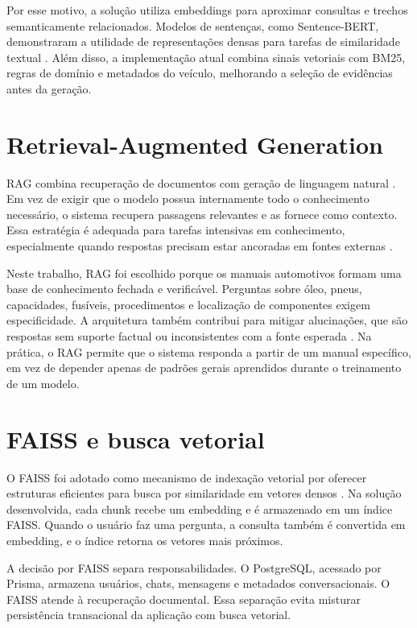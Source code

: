 Por esse motivo, a solução utiliza embeddings para aproximar consultas e trechos semanticamente relacionados. Modelos de sentenças, como Sentence-BERT, demonstraram a utilidade de representações densas para tarefas de similaridade textual \cite{reimers2019sentencebert}. Além disso, a implementação atual combina sinais vetoriais com \acf{BM25}, regras de domínio e metadados do veículo, melhorando a seleção de evidências antes da geração.

\section{Retrieval-Augmented Generation}

RAG combina recuperação de documentos com geração de linguagem natural \cite{lewis2020rag}. Em vez de exigir que o modelo possua internamente todo o conhecimento necessário, o sistema recupera passagens relevantes e as fornece como contexto. Essa estratégia é adequada para tarefas intensivas em conhecimento, especialmente quando respostas precisam estar ancoradas em fontes externas \cite{gao2023rag}.

Neste trabalho, RAG foi escolhido porque os manuais automotivos formam uma base de conhecimento fechada e verificável. Perguntas sobre óleo, pneus, capacidades, fusíveis, procedimentos e localização de componentes exigem especificidade. A arquitetura também contribui para mitigar alucinações, que são respostas sem suporte factual ou inconsistentes com a fonte esperada \cite{huang2023hallucination}. Na prática, o RAG permite que o sistema responda a partir de um manual específico, em vez de depender apenas de padrões gerais aprendidos durante o treinamento de um modelo.

\section{FAISS e busca vetorial}

O FAISS foi adotado como mecanismo de indexação vetorial por oferecer estruturas eficientes para busca por similaridade em vetores densos \cite{johnson2021faiss}. Na solução desenvolvida, cada chunk recebe um embedding e é armazenado em um índice FAISS. Quando o usuário faz uma pergunta, a consulta também é convertida em embedding, e o índice retorna os vetores mais próximos.

A decisão por FAISS separa responsabilidades. O PostgreSQL, acessado por Prisma, armazena usuários, chats, mensagens e metadados conversacionais. O FAISS atende à recuperação documental. Essa separação evita misturar persistência transacional da aplicação com busca vetorial.

